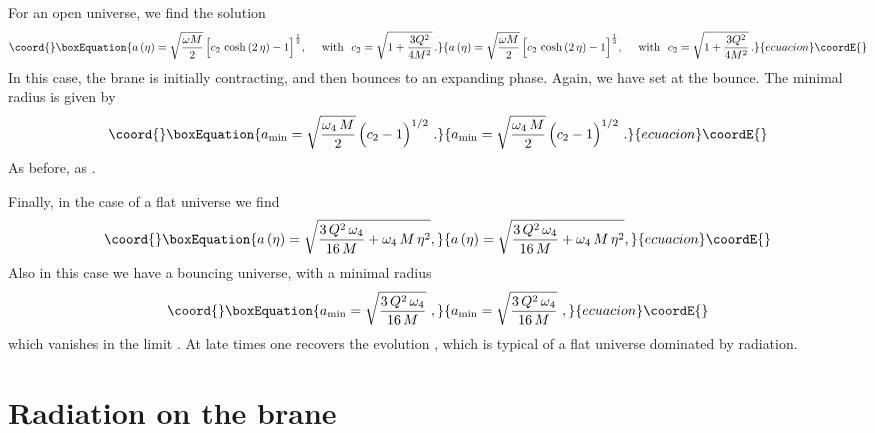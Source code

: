 \documentclass[a4paper,11pt]{article}
\begin{document}
For an open universe, we find the solution
%
\begin{equation}\coord{}\boxEquation{
a \left( \eta \right) = \sqrt{\omega M\over 2} \, \Big[ c_2 ~{\rm cosh } \left( 2 \, \eta \right)  -1 \Big]^{1\over 2}, ~~~~{\rm with}~~ c_2 
= \sqrt{1 + {3 Q^2 \over{4 M^2}}} \,.
\label{oscale}
}{
a \left( \eta \right) = \sqrt{\omega M\over 2} \, \Big[ c_2 ~{\rm cosh } \left( 2 \, \eta \right)  -1 \Big]^{1\over 2}, ~~~~{\rm with}~~ c_2 
= \sqrt{1 + {3 Q^2 \over{4 M^2}}} \,.
}{ecuacion}\coordE{}\end{equation}
%
In this case, the brane is initially contracting, and then bounces to an
expanding phase. Again, we have set \coordHE{} at the bounce. The minimal
radius is given by
%
\begin{equation}\coord{}\boxEquation{
a_{\rm min} = \sqrt{\frac{\omega_4 \, M}{2}} \, \Big( c_2 - 1 \Big)^{1/2} \,\,.
}{
a_{\rm min} = \sqrt{\frac{\omega_4 \, M}{2}} \, \Big( c_2 - 1 \Big)^{1/2} \,\,.
}{ecuacion}\coordE{}\end{equation}
%
As before, \coordHE{} as \coordHE{}.

Finally, in the case of a flat universe we find
%
\begin{equation}\coord{}\boxEquation{
a \left( \eta \right) = \sqrt{{3 \, Q^2 \, \omega_4\over{16 \, M}} + \omega_4 \, M \, \eta^2},
\label{fscale}
}{
a \left( \eta \right) = \sqrt{{3 \, Q^2 \, \omega_4\over{16 \, M}} + \omega_4 \, M \, \eta^2},
}{ecuacion}\coordE{}\end{equation}
%
Also in this case we have a bouncing universe, with a minimal radius
%
\begin{equation}\coord{}\boxEquation{
a_{\rm min} = \sqrt{\frac{3 \, Q^2 \, \omega_4}{16 \, M}} \,\,,
}{
a_{\rm min} = \sqrt{\frac{3 \, Q^2 \, \omega_4}{16 \, M}} \,\,,
}{ecuacion}\coordE{}\end{equation}
%
which vanishes in the limit \coordHE{}. At late times one
recovers the evolution \coordHE{}, which is typical of a flat universe dominated by radiation.


\section{Radiation on the brane}~\label{radio}
\end{document}
